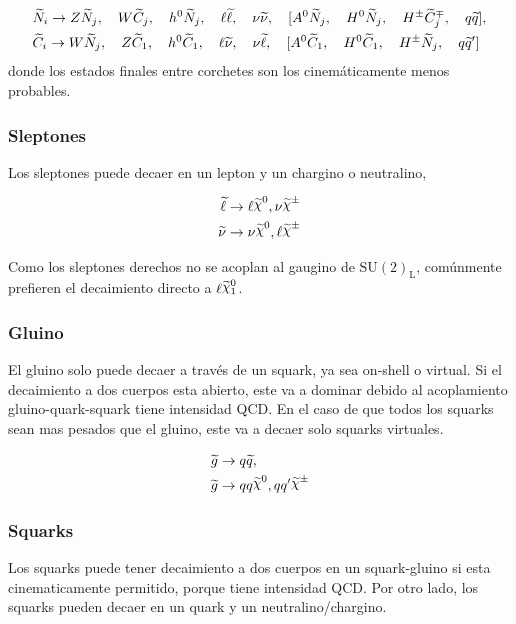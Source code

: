 \begin{align*}
  &\widetilde{N}_i \rightarrow Z \widetilde{N}_j, \quad W \widetilde{C}_j, \quad h^0 \widetilde{N}_j, \quad
  \ell \widetilde{\ell}, \quad \nu \widetilde{\nu}, \quad [A^0 \widetilde{N}_j, \quad H^0
    \widetilde{N}_j, \quad H^{\pm} \widetilde{C}_j^{\mp}, \quad q \widetilde{q}],
  \\ &\widetilde{C}_i \rightarrow W \widetilde{N}_j, \quad Z \widetilde{C}_1, \quad h^0 \widetilde{C}_1,
  \quad \ell \widetilde{\nu}, \quad \nu \widetilde{\ell}, \quad [A^0 \widetilde{C}_1, \quad H^0
    \widetilde{C}_1, \quad H^{\pm} \widetilde{N}_j, \quad q \widetilde{q}']
\end{align*}
%
donde los estados finales entre corchetes son los cinemáticamente menos
probables.


\subsubsection{Sleptones}

Los sleptones puede decaer en un lepton y un chargino o neutralino,

\begin{align}
  \slepton &\to \ell \nino, \nu\chinopm \\ \snu &\to \nu\nino, \ell\chinopm
\end{align}

Como los sleptones derechos no se acoplan al gaugino de $\text{SU}(2)_\text{L}$,
comúnmente prefieren el decaimiento directo a $\ell\ninoone$.


\subsubsection{Gluino}

El gluino solo puede decaer a través de un squark, ya sea on-shell o virtual. Si
el decaimiento a dos cuerpos esta abierto, este va a dominar debido al
acoplamiento gluino-quark-squark tiene intensidad QCD. En el caso de que todos
los squarks sean mas pesados que el gluino, este va a decaer solo squarks
virtuales.

\begin{align}
  &\gluino \to q\susy{q}, \\ &\gluino \to qq\nino, qq^\prime \chinopm
\end{align}


\subsubsection{Squarks}

Los squarks puede tener decaimiento a dos cuerpos en un squark-gluino si esta
cinematicamente permitido, porque tiene intensidad QCD. Por otro lado, los
squarks pueden decaer en un quark y un neutralino/chargino.

